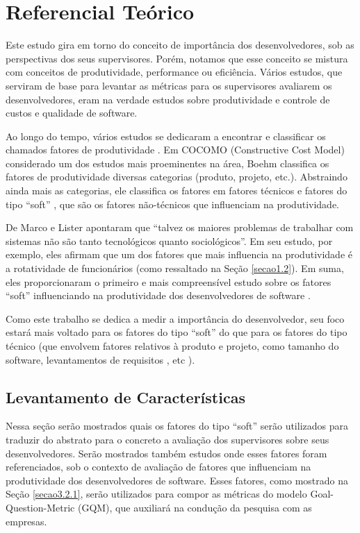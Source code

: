 \chapter[Referencial Teórico]{Referencial Teórico}

Este estudo gira em torno do conceito de importância dos desenvolvedores, sob as perspectivas dos seus supervisores. Porém, notamos que esse conceito se mistura com conceitos de produtividade, performance ou eficiência. Vários estudos, que serviram de base para levantar as métricas para os supervisores avaliarem os desenvolvedores, eram na verdade estudos sobre produtividade e controle de custos e qualidade de software.

Ao longo do tempo, vários estudos se dedicaram a encontrar e classificar os chamados fatores de produtividade \cite{Vosburgh1984, Walston1977,Brooks1981,Hanson1985,Jones1986,Boehm1988,Jones1997,Scudder1991,Banker1991,Boehm1984,Banker1987,Scacchi1995,Briand1998,Jones2000,Lokan2001,Clincy2003,Wagner2008,deBarrosSampaio2010}. Em COCOMO \cite{Boehm2000} (Constructive Cost Model) considerado um dos estudos mais proeminentes na área, Boehm classifica os fatores de produtividade diversas categorias (produto, projeto, etc.). Abstraindo ainda mais as categorias, ele classifica os fatores em fatores técnicos e fatores do tipo “soft” \cite{Wagner2008}, que são os fatores não-técnicos que influenciam na produtividade.

De Marco e Lister \cite{DeMarco1987} apontaram que “talvez os maiores problemas de trabalhar com sistemas não são tanto tecnológicos quanto sociológicos”. Em seu estudo, por exemplo, eles afirmam que um dos fatores que mais influencia na produtividade é a rotatividade de funcionários (como ressaltado na Seção \ref{secao1.2}). Em suma, eles proporcionaram o primeiro e mais compreensível estudo sobre os fatores “soft” influenciando na produtividade dos desenvolvedores de software \cite{Wagner2008}.

Como este trabalho se dedica a medir a importância do desenvolvedor, seu foco estará mais voltado para os fatores do tipo “soft” do que para os fatores do tipo técnico (que envolvem fatores relativos à produto e projeto, como tamanho do software, levantamentos de requisitos , etc \cite{deBarrosSampaio2010}).

\section{Levantamento de Características}\label{referencial_levantamento}
Nessa seção serão mostrados quais os fatores do tipo “soft” serão utilizados para traduzir do abstrato para o concreto a avaliação dos supervisores sobre seus desenvolvedores. Serão mostrados também estudos onde esses fatores foram referenciados, sob o contexto de avaliação de fatores que influenciam na produtividade dos desenvolvedores de software. Esses fatores, como mostrado na Seção \ref{secao3.2.1}, serão utilizados para compor as métricas do modelo Goal-Question-Metric (GQM), que auxiliará na condução da pesquisa com as empresas. 

